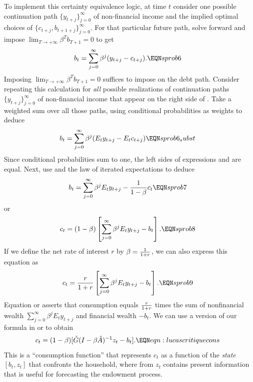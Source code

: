 To implement this certainty equivalence logic, at time $t$ consider one possible continuation path 
$\{y_{t+j}\}_{j=0}^\infty$ of non-financial income and the  implied 
optimal choices of $\{c_{t+j}, b_{t+1+j}\}_{j=0}^\infty$.
For that particular future path, 
solve  forward and impose $\lim_{T\rightarrow +\infty} \beta^T b_{T+1} =0$ to get
$$ b_t = \sum_{j=0}^\infty \beta^j (y_{t+j} - c_{t+j}) .  \EQN sprob6 $$
Imposing $\lim_{T\rightarrow +\infty} \beta^T b_{T+1} =0$ suffices to impose  on the debt path. Consider repeating this calculation 
 for {\it all\/} possible realizations of continuation paths $\{y_{t+j}\}_{j=0}^\infty$ of non-financial income that appear on the right side of .
 Take a weighted  sum 
over all those paths, using conditional probabilities as weights to deduce
$$ b_t = \sum_{j=0}^\infty \beta^j (E_t y_{t+j} - E_t c_{t+j})   \EQN sprob6_subst $$
Since  conditional probabilities sum to one,   the left sides of  expressions
 and  are equal.
Next, use 
and the law of iterated expectations to deduce
$$ b_t = \sum_{j=0}^\infty \beta^j E_t y_{t+j} - {1 \over 1-\beta} c_t
\EQN sprob7 $$
 or
$$ c_t = (1-\beta)
\left[ \sum_{j=0}^\infty \beta^j E_t y_{t+j} - b_t\right].
 \EQN sprob8  $$
If we define the net rate of interest $r$ by $\beta ={1 \over 1+r}$, we can
also express this
equation as
$$ c_t = {r \over 1+r}
\left[ \sum_{j=0}^\infty \beta^j E_t y_{t+j} - b_t\right]. \EQN sprob9 $$
Equation  or  asserts that consumption  equals
 ${r \over 1+r}$ times
the sum of nonfinancial wealth $
\sum_{j=0}^\infty \beta^j E_t y_{t+j}$ and financial
wealth $-b_t$.   We can use a version of  our formula  in   or  to obtain
$$  c_t  = (1-\beta) [ \check G(I-\beta \check A)^{-1} z_t - b_t ]  .  \EQN eqn:lucascritiquecons $$
This is a ``consumption function'' that   represents
$c_t$  as a function of the {\it state\/} $[b_t, z_t]$ that
 confronts the household, where  from  $z_t$ contains present
information that is useful for forecasting the endowment process.







